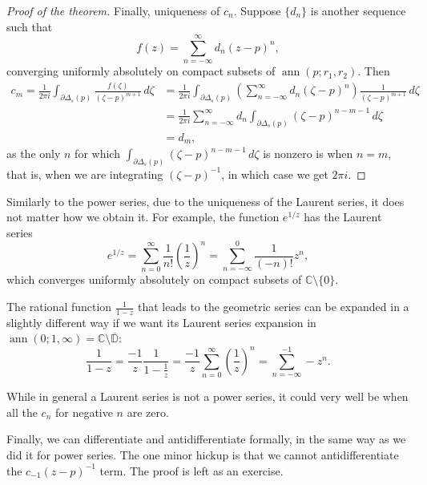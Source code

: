 \documentclass[12pt,openany]{book}
\newcommand{\ann}{\operatorname{ann}}
\newcommand{\C}{{\mathbb{C}}}
\newcommand{\D}{{\mathbb{D}}}
\theoremstyle{plain}
\theoremstyle{remark}
\theoremstyle{definition}
\theoremstyle{exercise}
\theoremstyle{example}
\begin{document}
\begin{proof}[Proof of the theorem]
Finally, uniqueness of $c_n$.  Suppose $\{ d_n \}$ is another sequence such
that
\begin{equation*}
f(z)
=
\sum_{n=-\infty}^{\infty} d_n {(z-p)}^{n} ,
\end{equation*}
converging uniformly absolutely on compact subsets of $\ann(p;r_1,r_2)$.
Then
\begin{equation*}
\begin{split}
c_m = \frac{1}{2\pi i}
\int_{\partial \Delta_{s}(p)} \frac{f(\zeta)}{{(\zeta-p)}^{m+1}}
 \, d\zeta 
& =
\frac{1}{2\pi i}
\int_{\partial \Delta_{s}(p)}
\left(\sum_{n=-\infty}^{\infty} d_n {(\zeta-p)}^{n} \right)
\frac{1}{{(\zeta-p)}^{m+1}}
 \, d\zeta 
\\
& =
\frac{1}{2\pi i}
\sum_{n=-\infty}^{\infty}
d_n
\int_{\partial \Delta_{s}(p)}
{(\zeta-p)}^{n-m-1}
 \, d\zeta 
\\
& =
d_m ,
\end{split}
\end{equation*}
as the only $n$ for which
$\int_{\partial \Delta_{s}(p)}
{(\zeta-p)}^{n-m-1}
 \, d\zeta$ is nonzero is when $n=m$, that is, when we are integrating
${(\zeta-p)}^{-1}$, in which case we get $2 \pi i$.
\end{proof}

Similarly to the power series, due to the uniqueness of the Laurent series,
it does not matter how we obtain it.  For example, the function $e^{1/z}$
has the Laurent series
\begin{equation*}
e^{1/z}
=
\sum_{n=0}^{\infty} \frac{1}{n!} {\left(\frac{1}{z}\right)}^n
=
\sum_{n=-\infty}^0 \frac{1}{(-n)!} z^n ,
\end{equation*}
which converges uniformly absolutely on compact subsets of
$\C \setminus \{ 0 \}$.

The rational function $\frac{1}{1-z}$ that leads to the geometric series can
be expanded in a slightly different way if we want its Laurent series
expansion in $\ann(0;1,\infty) = \C \setminus \overline{\D}$:
\begin{equation*}
\frac{1}{1-z}
=
\frac{-1}{z}
\frac{1}{1-\frac{1}{z}}
=
\frac{-1}{z}
\sum_{n=0}^\infty
{\left(\frac{1}{z}\right)}^n
=
\sum_{n=-\infty}^{-1}
- z^{n} .
\end{equation*}

While in general a Laurent series is not a power series,
it could very well be when all the $c_n$ for negative $n$ are zero.

\medskip

Finally, we can differentiate and antidifferentiate
formally, in the same way as we did it for power series.  The one minor
hickup is that we cannot antidifferentiate the $c_{-1}{(z-p)}^{-1}$ term.
The proof is left as an exercise.
\end{document}
